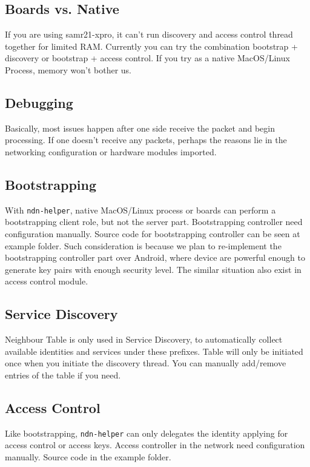 \documentclass[a4paper, 11pt]{article}
\begin{document}
    \subsection*{Boards vs. Native}
    If you are using samr21-xpro, it can't run discovery and access control thread together for limited RAM. Currently you can try the combination bootstrap + discovery or bootstrap + access control. If you try as a native MacOS/Linux Process, memory won't bother us.
    
    \subsection*{Debugging}
    Basically, most issues happen after one side receive the packet and begin processing. If one doesn't receive any packets, perhaps the reasons lie in the networking configuration or hardware modules imported.
    
    \subsection*{Bootstrapping}
    With \texttt{ndn-helper}, native MacOS/Linux process or boards can perform a bootstrapping client role, but not the server part. Bootstrapping controller need configuration manually. Source code for bootstrapping controller can be seen at example folder. Such consideration is because we plan to re-implement the bootstrapping controller part over Android, where device are powerful enough to generate key pairs with enough security level. The similar situation also exist in access control module.
    
    \subsection*{Service Discovery}
    Neighbour Table is only used in Service Discovery, to automatically collect available identities and services under these prefixes. Table will only be initiated once when you initiate the discovery thread. You can manually add/remove entries of the table if you need.
    
    \subsection*{Access Control}
    Like bootstrapping, \texttt{ndn-helper} can only delegates the identity applying for access control or access keys. Access controller in the network need configuration manually. Source code in the example folder.
\end{document}
